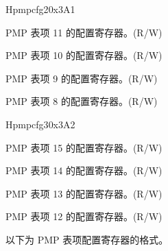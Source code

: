 \begin{register}{H}{pmpcfg2}{0x3A1}
\label{regdesc:pmpcfg2}%
%
%
%
%
\regnewline%
\begin{regdesc}
\begin{reglist}
\label{fielddesc:pmp11cfg}\item [pmp11cfg] PMP 表项 11 的配置寄存器。(R/W)\\
\label{fielddesc:pmp10cfg}\item [pmp10cfg] PMP 表项 10 的配置寄存器。(R/W)\\
\label{fielddesc:pmp9cfg}\item [pmp9cfg] PMP 表项 9 的配置寄存器。(R/W)\\
\label{fielddesc:pmp8cfg}\item [pmp8cfg] PMP 表项 8 的配置寄存器。(R/W)\\
\end{reglist}
\end{regdesc}
\end{register}

\begin{register}{H}{pmpcfg3}{0x3A2}
\label{regdesc:pmpcfg3}%
%
%
%
%
\regnewline%
\begin{regdesc}
\begin{reglist}
\label{fielddesc:pmp15cfg}\item [pmp15cfg] PMP 表项 15 的配置寄存器。(R/W)\\
\label{fielddesc:pmp14cfg}\item [pmp14cfg] PMP 表项 14 的配置寄存器。(R/W)\\
\label{fielddesc:pmp13cfg}\item [pmp13cfg] PMP 表项 13 的配置寄存器。(R/W)\\
\label{fielddesc:pmp12cfg}\item [pmp12cfg] PMP 表项 12 的配置寄存器。(R/W)\\
\end{reglist}
\end{regdesc}
\end{register}


以下为 PMP 表项配置寄存器的格式。

